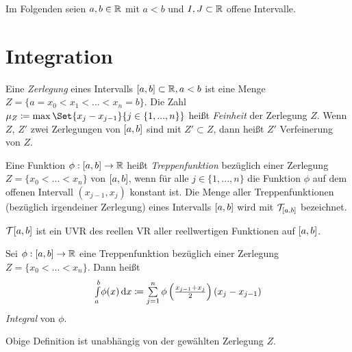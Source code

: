 \documentclass{cheat-sheet}
\begin{document}

\begin{nota}
  Im Folgenden seien $a, b \in \mathbb{R}$ mit $a < b$ und $I, J \subset \mathbb{R}$ offene Intervalle.
\end{nota}

\section{Integration}

\begin{defn}
  Eine \emph{Zerlegung} eines Intervalls $\left[ a, b \right] \subset \mathbb{R}, a < b$ ist eine Menge $Z = \{ a = x_{0} < x_{1} < ... < x_{n} = b \}$. Die Zahl $\mu_{Z} \coloneqq \max\Set{x_{j} - x_{j-1}}{j \in \{1, ..., n\}}$ heißt \emph{Feinheit} der Zerlegung $Z$. Wenn $Z$, $Z'$ zwei Zerlegungen von $\left[ a, b \right]$ sind mit $Z' \subset Z$, dann heißt $Z'$ Verfeinerung von $Z$.
\end{defn}

\begin{defn}
  Eine Funktion $\phi : \left[ a, b \right] \to \mathbb{R}$ heißt \emph{Treppenfunktion} bezüglich einer Zerlegung $Z = \{ x_{0} < ... < x_{n} \}$ von $\left[ a, b \right]$, wenn für alle $j \in \{ 1, ..., n \}$ die Funktion $\phi$ auf dem offenen Intervall $(x_{j-1}, x_{j})$ konstant ist. Die Menge aller Treppenfunktionen (bezüglich irgendeiner Zerlegung) eines Intervalls $\left[ a, b \right]$ wird mit $\mathcal{T}_{\left[ a, b \right]}$ bezeichnet.
\end{defn}

\begin{satz}
  $\mathcal{T}{\left[ a, b \right]}$ ist ein UVR des reellen VR aller reellwertigen Funktionen auf $\left[ a, b \right]$.
\end{satz}

\begin{defn}
  Sei $\phi : \left[ a, b \right] \to \mathbb{R}$ eine Treppenfunktion bezüglich einer Zerlegung $Z = \{ x_0 < ... < x_n \}$. Dann heißt
  \[ \Intabdx{\phi(x)} \coloneqq \sum_{j = 1}^{n} \phi\left(\tfrac{x_{j-1} + x_j}{2}\right)(x_j - x_{j-1}) \]
  \emph{Integral} von $\phi$.
\end{defn}

\begin{bem}
  Obige Definition ist unabhängig von der gewählten Zerlegung $Z$.
\end{bem}
\end{document}
